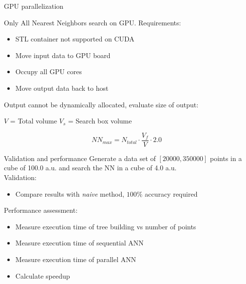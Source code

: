 \documentclass{beamer}
\begin{document}
\begin{frame}{GPU parallelization}
\begin{center}
Only All Nearest Neighbors search on GPU.
\vspace{0.5cm}
Requirements:
\begin{itemize}
\item STL container not supported on CUDA
\item Move input data to GPU board
\item Occupy all GPU cores
\item Move output data back to host
\end{itemize}
\end{center}
\vspace{5mm}
Output cannot be dynamically allocated, evaluate size of output:
\begin{center}
$V$ = Total volume \hspace{5mm} $V_s$ = Search box volume
\end{center}
\vspace{0.5cm}
\begin{equation}
NN_{max} = N_{total} \cdot \dfrac{V_f}{V}\cdot 2.0
\end{equation}
\end{frame}

\begin{frame}{Validation and performance}
Generate a data set of $[20000, 350000]$ points in a cube of 100.0 a.u. and search the NN in a cube of 4.0 a.u.\\
\vspace{5mm}
Validation:
\begin{itemize}
\item Compare results with \textit{naive} method, $100\%$ accuracy required
\end{itemize}
\vspace{5mm}
Performance assessment:
\begin{itemize}
\item Measure execution time of tree building vs number of points
\item Measure execution time of sequential ANN
\item Measure execution time of parallel ANN
\item Calculate speedup
\end{itemize}
\end{frame}
\end{document}
